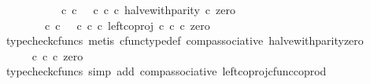 \begin{isabellebody}
\ \ \isamarkupfalse%
\ {\isacharminus}{\kern0pt}\isanewline
\ \ \ \ \isamarkupfalse%
\ {\isachardoublequoteopen}{\isacharparenleft}{\kern0pt}{\isacharparenleft}{\kern0pt}{\isasymt}\ {\isasymcirc}\isactrlsub c\ {\isasymbeta}\isactrlbsub {\isasymnat}\isactrlsub c\isactrlesub {\isacharparenright}{\kern0pt}\ {\isasymamalg}\ {\isacharparenleft}{\kern0pt}{\isasymf}\ {\isasymcirc}\isactrlsub c\ {\isasymbeta}\isactrlbsub {\isasymnat}\isactrlsub c\isactrlesub {\isacharparenright}{\kern0pt}\ {\isasymcirc}\isactrlsub c\ halve{\isacharunderscore}{\kern0pt}with{\isacharunderscore}{\kern0pt}parity{\isacharparenright}{\kern0pt}\ {\isasymcirc}\isactrlsub c\ zero\isanewline
\ \ \ \ \ \ {\isacharequal}{\kern0pt}\ {\isacharparenleft}{\kern0pt}{\isasymt}\ {\isasymcirc}\isactrlsub c\ {\isasymbeta}\isactrlbsub {\isasymnat}\isactrlsub c\isactrlesub {\isacharparenright}{\kern0pt}\ {\isasymamalg}\ {\isacharparenleft}{\kern0pt}{\isasymf}\ {\isasymcirc}\isactrlsub c\ {\isasymbeta}\isactrlbsub {\isasymnat}\isactrlsub c\isactrlesub {\isacharparenright}{\kern0pt}\ {\isasymcirc}\isactrlsub c\ left{\isacharunderscore}{\kern0pt}coproj\ {\isasymnat}\isactrlsub c\ {\isasymnat}\isactrlsub c\ {\isasymcirc}\isactrlsub c\ zero{\isachardoublequoteclose}\isanewline
\ \ \ \ \ \ \isamarkupfalse%
\ {\isacharparenleft}{\kern0pt}typecheck{\isacharunderscore}{\kern0pt}cfuncs{\isacharcomma}{\kern0pt}\ metis\ cfunc{\isacharunderscore}{\kern0pt}type{\isacharunderscore}{\kern0pt}def\ comp{\isacharunderscore}{\kern0pt}associative\ halve{\isacharunderscore}{\kern0pt}with{\isacharunderscore}{\kern0pt}parity{\isacharunderscore}{\kern0pt}zero{\isacharparenright}{\kern0pt}\isanewline
\ \ \ \ \isamarkupfalse%
\ \isamarkupfalse%
\ {\isachardoublequoteopen}{\isachardot}{\kern0pt}{\isachardot}{\kern0pt}{\isachardot}{\kern0pt}\ {\isacharequal}{\kern0pt}\ {\isacharparenleft}{\kern0pt}{\isasymt}\ {\isasymcirc}\isactrlsub c\ {\isasymbeta}\isactrlbsub {\isasymnat}\isactrlsub c\isactrlesub {\isacharparenright}{\kern0pt}\ {\isasymcirc}\isactrlsub c\ zero{\isachardoublequoteclose}\isanewline
\ \ \ \ \ \ \isamarkupfalse%
\ {\isacharparenleft}{\kern0pt}typecheck{\isacharunderscore}{\kern0pt}cfuncs{\isacharcomma}{\kern0pt}\ simp\ add{\isacharcolon}{\kern0pt}\ comp{\isacharunderscore}{\kern0pt}associative{}\ left{\isacharunderscore}{\kern0pt}coproj{\isacharunderscore}{\kern0pt}cfunc{\isacharunderscore}{\kern0pt}coprod{\isacharparenright}{\kern0pt}\isanewline
\ \ \ \ \isamarkupfalse%
\ \isamarkupfalse%

\end{isabellebody}
